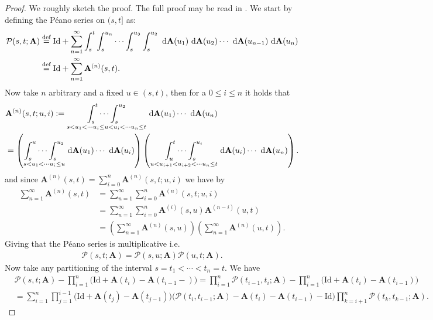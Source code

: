 \documentclass[12pt,letter,twoside]{article}
\theoremstyle{plain}
\theoremstyle{definition}
\theoremstyle{remark}
\begin{document}
\begin{proof}
We roughly sketch the proof. The full proof may be read in \cite{Gill1990}. We start by defining the Péano series on $(s,t]$ as:
\begin{align}
\mathcal P(s,t;\mathbf A)&\stackrel{\text{def}}{=}\text{Id} + \sum_{n=1}^\infty \int_s^t\int_s^{u_{n}}\cdots \int_s^{u_{3}}\int_s^{u_{2}} \ \text d\mathbf A(u_1)\ \text d\mathbf A(u_{2})\cdots \ \text d\mathbf A(u_{n-1})\ \text d\mathbf A(u_n)\label{eq:peano}\\
&\stackrel{\text{def}}{=}\text{Id} +\sum_{n=1}^\infty \mathbf A^{(n)}(s,t).
\end{align}
Now take $n$ arbitrary and a fixed $u\in (s,t)$, then for a $0\le i\le n$ it holds that
\begin{align}
    &\mathbf A^{(n)}(s,t;u,i):=\underset{s<u_1<\cdots u_i\le u< u_i<\cdots u_n\le t}{\int_s^t\cdots \int_s^{u_{2}}}\ \text d\mathbf A(u_{1})\cdots \ \text d\mathbf A(u_n)\\
    &=\left(\underset{s<u_1<\cdots u_i\le u}{\int_s^u\cdots \int_s^{u_{2}}}\ \text d\mathbf A(u_{1})\cdots \ \text d\mathbf A(u_i)\right)\left(\underset{u<u_{i+1}<u_{i+2}<\cdots u_n\le t}{\int_u^t\cdots \int_s^{u_{i}}}\ \text d\mathbf A(u_{i})\cdots \ \text d\mathbf A(u_n)\right).
\end{align}
and since $\mathbf A^{(n)}(s,t)=\sum_{i=0}^n \mathbf A^{(n)}(s,t;u,i)$ we have by
\begin{align}
\sum_{n=1}^\infty \mathbf A^{(n)}(s,t)&=\sum_{n=1}^\infty \sum_{i=0}^n \mathbf A^{(n)}(s,t;u,i)\\
&=\sum_{n=1}^\infty \sum_{i=0}^n \mathbf A^{(i)}(s,u)\mathbf A^{(n-i)}(u,t)\\
&=\left(\sum_{n=1}^\infty \mathbf A^{(n)}(s,u)\right)\left(\sum_{n=1}^\infty \mathbf A^{(n)}(u,t)\right).
\end{align}
Giving that the Péano series is multiplicative i.e.
\begin{align}
    \mathcal P(s,t;\mathbf A)=\mathcal P(s,u;\mathbf A)\mathcal P(u,t;\mathbf A).
\end{align}
Now take any partitioning of the interval $s=t_1<\cdots <t_n=t$. We have
\begin{align}
&\mathcal P(s,t;\mathbf A)-\prod_{i=1}^n\Big(\text{Id}+\mathbf A(t_i)-\mathbf A(t_{i-1}-)\Big)=\prod_{i=1}^n\mathcal P(t_{i-1},t_i;\mathbf A)-\prod_{i=1}^n\Big(\text{Id}+\mathbf A(t_i)-\mathbf A(t_{i-1})\Big)\\
&=\sum_{i=1}^n\prod_{j=1}^{i-1}\Big(\text{Id}+\mathbf A(t_j)-\mathbf A(t_{j-1})\Big)\Big(\mathcal P(t_i,t_{i-1};\mathbf A) - \mathbf A(t_i)-\mathbf A(t_{i-1}) - \text{Id}\Big)\prod_{k=i+1}^n\mathcal P(t_{k},t_{k-1};\mathbf A).

\end{align}
\end{proof}
\end{document}
